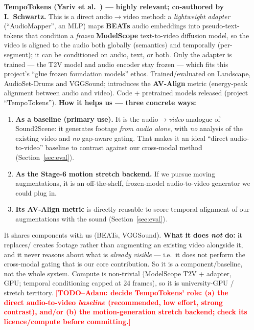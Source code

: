 \documentclass[11pt,a4paper]{article}
\newcommand{\TODO}[1]{\textcolor{red}{\textbf{[TODO--Adam: #1]}}}
\begin{document}
\textbf{TempoTokens (Yariv et al.~\cite{tempotokens}) --- highly relevant; co-authored by
I.\ Schwartz.} This is a direct audio$\rightarrow$video method: a \emph{lightweight adapter}
(``AudioMapper'', an MLP) maps \textbf{BEATs} audio embeddings into pseudo-text-tokens that condition
a \emph{frozen} \textbf{ModelScope} text-to-video diffusion model, so the video is aligned to the
audio both globally (semantics) and temporally (per-segment); it can be conditioned on audio, text,
or both. Only the adapter is trained --- the T2V model and audio encoder stay frozen --- which fits
this project's ``glue frozen foundation models'' ethos. Trained/evaluated on Landscape,
AudioSet-Drums and VGGSound; introduces the \textbf{AV-Align} metric (energy-peak alignment between
audio and video). Code + pretrained models released (project ``TempoTokens'').
\textbf{How it helps us --- three concrete ways:}
\begin{enumerate}
  \item \textbf{As a baseline (primary use).} It is the audio$\rightarrow$\emph{video} analogue of
    Sound2Scene: it generates footage \emph{from audio alone}, with \emph{no} analysis of the
    existing video and \emph{no} gap-aware gating. That makes it an ideal ``direct audio-to-video''
    baseline to contrast against our cross-modal method (Section~\ref{sec:eval}).
  \item \textbf{As the Stage-6 motion stretch backend.} If we pursue moving augmentations, it is an
    off-the-shelf, frozen-model audio-to-video generator we could plug in.
  \item \textbf{Its AV-Align metric} is directly reusable to score temporal alignment of our
    augmentations with the sound (Section~\ref{sec:eval}).
\end{enumerate}
It shares components with us (BEATs, VGGSound). \textbf{What it does \emph{not} do:} it replaces/
creates footage rather than augmenting an existing video alongside it, and it never reasons about
what is \emph{already visible} --- i.e.\ it does not perform the cross-modal gating that is our core
contribution. So it is a component/baseline, not the whole system. Compute is non-trivial (ModelScope
T2V + adapter, GPU; temporal conditioning capped at 24 frames), so it is university-GPU / stretch
territory. \TODO{decide TempoTokens' role: (a) the direct audio-to-video \emph{baseline} (recommended,
low effort, strong contrast), and/or (b) the motion-generation stretch backend; check its
licence/compute before committing.}
\end{document}
